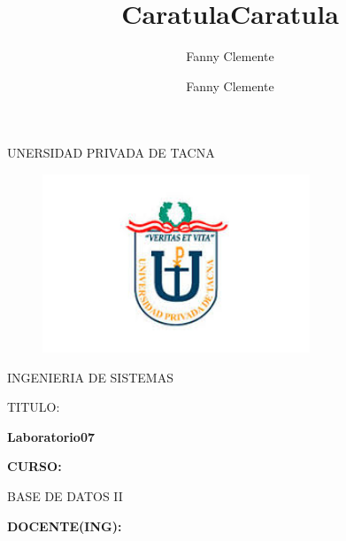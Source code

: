 \documentclass[12pt,letterpaper]{article}
\author{Fanny Clemente}
\title{Caratula}
\begin{document}
\author{Fanny Clemente}
\title{Caratula}

\begin{titlepage}
\begin{center}
\large{UNERSIDAD PRIVADA DE TACNA}\\
\vspace*{-0.025in}
\begin{figure}[htb]
\begin{center}
\includegraphics[width=8cm]{./IMAGENES/logo}
\end{center}
\end{figure}
\vspace*{0.15in}
INGENIERIA DE SISTEMAS  \\

\vspace*{0.5in}
\begin{large}
TITULO:\\
\end{large}

\vspace*{0.1in}
\begin{Large}
\textbf{Laboratorio07} \\
\end{Large}

\vspace*{0.3in}
\begin{Large}
\textbf{CURSO:} \\
\end{Large}

\vspace*{0.1in}
\begin{large}
BASE DE DATOS II\\
\end{large}

\vspace*{0.3in}
\begin{Large}
\textbf{DOCENTE(ING):} \\
\end{Large}


\end{center}
\end{titlepage}
\end{document}
